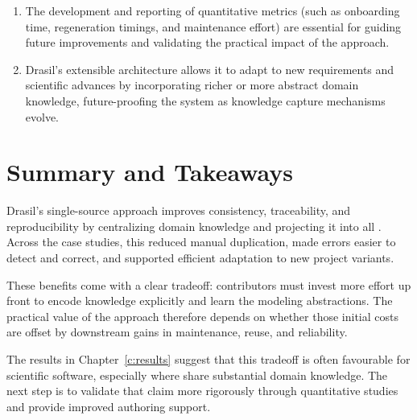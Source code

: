 \begin{enumerate}
  consistent maintenance of supporting materials (such as traceability matrices 
  and reference tables) that are often neglected or inconsistently updated in 
  traditional workflows.
\item The development and reporting of quantitative metrics (such as onboarding 
  time, regeneration timings, and maintenance effort) are essential for guiding 
  future improvements and validating the practical impact of the approach.
\item Drasil's extensible architecture allows it to adapt to new requirements 
  and scientific advances by incorporating richer or more abstract domain 
  knowledge, future-proofing the system as knowledge capture mechanisms evolve.
\end{enumerate}

\section{Summary and Takeaways}

Drasil's single-source approach improves consistency, traceability, and
reproducibility by centralizing domain knowledge and projecting it into all
\sfs{}. Across the case studies, this reduced manual duplication, made
errors easier to detect and correct, and supported efficient adaptation to new
project variants.

These benefits come with a clear tradeoff: contributors must invest more effort
up front to encode knowledge explicitly and learn the modeling abstractions.
The practical value of the approach therefore depends on whether those initial
costs are offset by downstream gains in maintenance, reuse, and reliability.

The results in Chapter~\ref{c:results} suggest that this tradeoff is often
favourable for scientific software, especially where \sfs{} share substantial
domain knowledge. The next step is to validate that claim more rigorously
through quantitative studies and provide improved authoring support.

